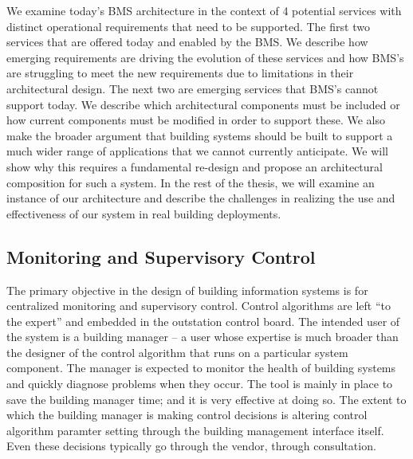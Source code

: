 We examine today's BMS architecture in the context
of 4 potential services with distinct operational requirements that need to be supported.  The first two services that 
are offered today and enabled by the BMS.  We describe how emerging requirements are driving the evolution of these
services and how BMS's are struggling to meet the new requirements due to limitations in their architectural design.
The next two are emerging services that BMS's cannot support today.  We describe which architectural components must be included
or how current components must be modified in order to support these.  We also make the broader argument that 
building systems should be built to support a much wider range of applications that we cannot currently anticipate.
We will show why this requires a fundamental re-design and propose an architectural composition for such a system.
In the rest of the thesis, we will examine an instance of our architecture and describe the challenges in realizing
the use and effectiveness of our system in real building deployments.


\subsection{Monitoring and Supervisory Control}
The primary objective in the design of building information systems is for centralized monitoring and supervisory
control.  Control algorithms are left ``to the expert'' and embedded in the outstation control board.  The intended
user of the system is a building manager -- a user whose expertise is much broader than the designer of the control
algorithm that runs on a particular system component.
The manager is expected to monitor the health of building systems and quickly diagnose problems when they occur.  The tool
is mainly in place to save the building manager time; and it is very effective at doing so.  The extent to which 
the building manager is making control decisions is altering control algorithm paramter setting through
the building management interface itself.  Even these decisions typically go through the vendor, through consultation.

